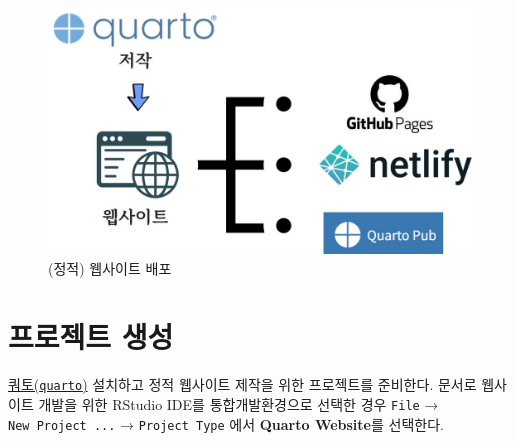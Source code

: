 \documentclass[
  letterpaper,
]{book}
\begin{document}
\begin{figure}

{\centering \includegraphics[width=4.6875in,height=\textheight]{images/dw_website.jpg}

}

\caption{(정적) 웹사이트 배포}

\end{figure}

\hypertarget{project-setup}{%
\section{프로젝트 생성}\label{project-setup}}

\href{https://quarto.org/}{쿼토(\texttt{quarto})} 설치하고 정적 웹사이트
제작을 위한 프로젝트를 준비한다. 문서로 웹사이트 개발을 위한 RStudio
IDE를 통합개발환경으로 선택한 경우 \texttt{File} →
\texttt{New\ Project\ ...} → \texttt{Project\ Type} 에서 \textbf{Quarto
Website}를 선택한다.
\end{document}
